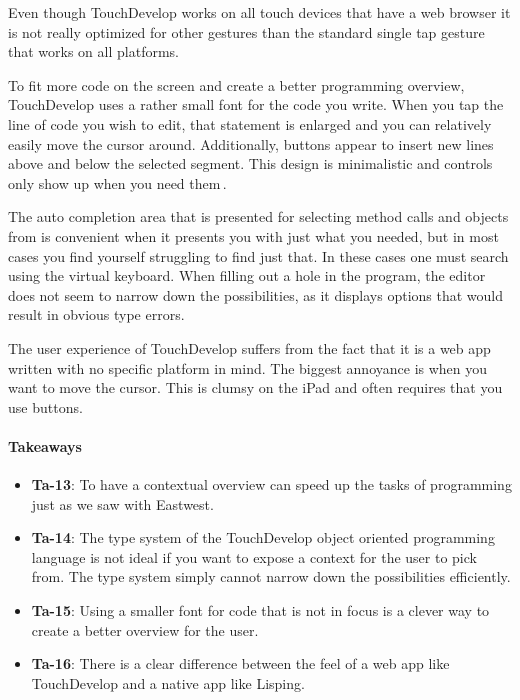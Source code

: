 Even though TouchDevelop works on all touch devices that have a web browser it is not really optimized for other gestures than the standard single tap gesture that works on all platforms.

To fit more code on the screen and create a better programming overview, TouchDevelop uses a rather small font for the code you write. 
When you tap the line of code you wish to edit, that statement is enlarged and you can relatively easily move the cursor around. 
Additionally, buttons appear to insert new lines above and below the selected segment. 
This design is minimalistic and controls only show up when you need them\,\cite{nielsen1990heuristic}.

The auto completion area that is presented for selecting method calls and objects from is convenient when it presents you with just what you needed, but in most cases you find yourself struggling to find just that.
In these cases one must search using the virtual keyboard.
When filling out a hole in the program, the editor does not seem to narrow down the possibilities, as it displays options that would result in obvious type errors.

The user experience of TouchDevelop suffers from the fact that it is a web app written with no specific platform in mind. The biggest annoyance is when you want to move the cursor. This is clumsy on the iPad and often requires that you use buttons.

\paragraph{Takeaways}
\begin{itemize}
	\item \textbf{Ta-13}: To have a contextual overview can speed up the tasks of programming just as we saw with Eastwest.
	\item \textbf{Ta-14}: The type system of the TouchDevelop object oriented programming language is not ideal if you want to expose a context for the user to pick from. The type system simply cannot narrow down the possibilities efficiently.
	\item \textbf{Ta-15}: Using a smaller font for code that is not in focus is a clever way to create a better overview for the user.
	\item \textbf{Ta-16}: There is a clear difference between the feel of a web app like TouchDevelop and a native app like Lisping.
\end{itemize}

